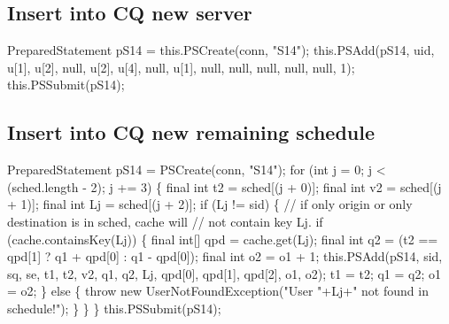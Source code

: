 \subsection{Insert into CQ new server}
\nwenddocs{}\endmoddef{}
PreparedStatement pS14 = this.PSCreate(conn, "S14");
this.PSAdd(pS14, uid, u[1], u[2], null, u[2], u[4], null, u[1],
    null, null, null, null, null, 1);
this.PSSubmit(pS14);
\nwendcode{}\nwdocspar

\subsection{Insert into CQ new remaining schedule}
\nwenddocs{}\endmoddef{}
PreparedStatement pS14 = PSCreate(conn, "S14");
for (int j = 0; j < (sched.length - 2); j += 3) \{
  final int t2 = sched[(j + 0)];
  final int v2 = sched[(j + 1)];
  final int Lj = sched[(j + 2)];
  if (Lj != sid) \{
    // if only origin or only destination is in sched, cache will
    // not contain key Lj.
    if (cache.containsKey(Lj)) \{
      final int[] qpd = cache.get(Lj);
      final int q2 = (t2 == qpd[1] ? q1 + qpd[0] : q1 - qpd[0]);
      final int o2 = o1 + 1;
      this.PSAdd(pS14, sid, sq, se, t1, t2, v2, q1, q2, Lj,
            qpd[0], qpd[1], qpd[2], o1, o2);
      t1 = t2;
      q1 = q2;
      o1 = o2;
    \} else \{
      throw new UserNotFoundException("User "+Lj+" not found in schedule!");
    \}
  \}
\}
this.PSSubmit(pS14);
\nwendcode{}\nwdocspar


